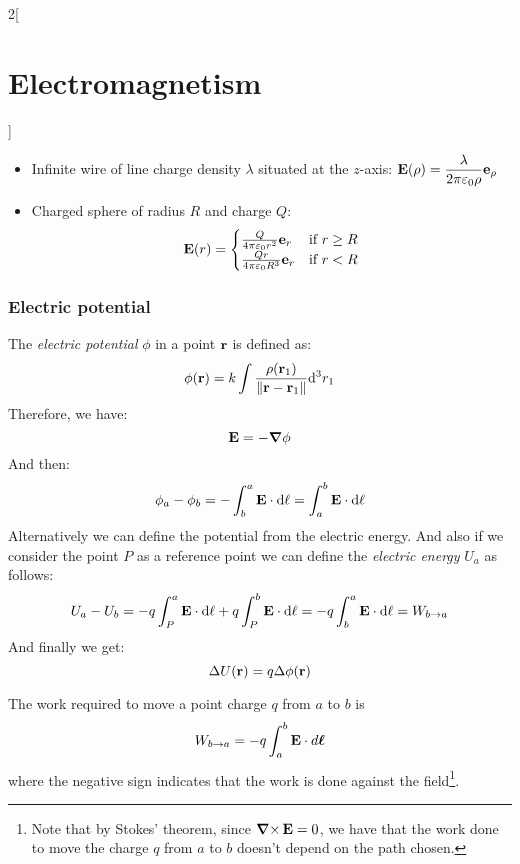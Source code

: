 \documentclass[../../../main_physics.tex]{subfiles}
\begin{document}
\begin{multicols}{2}[\section{Electromagnetism}]
\begin{proposition}
\begin{itemize}
      \item Infinite wire of line charge density $\lambda$ situated at the $z$-axis:  $\displaystyle \boldsymbol{\mathrm{E}}(\rho)=\frac{\lambda}{2\pi\varepsilon_0 \rho}\boldsymbol{\mathrm{e}}_\rho$
      \item Charged sphere of radius $R$ and charge $Q$:
            $$\boldsymbol{\mathrm{E}}(r)=
              \begin{cases}
                \frac{Q}{4\pi\varepsilon_0r^2}\boldsymbol{\mathrm{e}}_r  & \text{if }r\geq R \\
                \frac{Qr}{4\pi\varepsilon_0R^3}\boldsymbol{\mathrm{e}}_r & \text{if }r<R
              \end{cases}
            $$
    \end{itemize}
  \end{proposition}
  \subsubsection{Electric potential}
  \begin{definition}
    The \emph{electric potential} $\phi$ in a point $\boldsymbol{\mathrm{r}}$ is defined as:
    \begin{equation}
      \phi(\boldsymbol{\mathrm{r}})=k\int\frac{\rho(\boldsymbol{\mathrm{r}}_1)}{\|\boldsymbol{\mathrm{r}}-\boldsymbol{\mathrm{r}}_1\|}\dd^3 r_1
    \end{equation}
    Therefore, we have:
    \begin{equation}
      \boldsymbol{\mathrm{E}}=-\grad\phi
      \label{E_potential}
    \end{equation}
    And then: $$\phi_a-\phi_b=-\int_b^a\boldsymbol{\mathrm{E}}\cdot \dd{\ell}=\int_a^b\boldsymbol{\mathrm{E}}\cdot \dd{\ell}$$ Alternatively we can define the potential from the electric energy.  And also if we consider the point $P$ as a reference point we can define the \emph{electric energy} $U_a$ as follows: $$U_a-U_b=-q\int_P^a\boldsymbol{\mathrm{E}}\cdot \dd{\ell}+q\int_P^b\boldsymbol{\mathrm{E}}\cdot \dd{\ell}=-q\int_b^a\boldsymbol{\mathrm{E}}\cdot \dd{\ell}=W_{b\to a}$$ And finally we get: $$\Delta U(\boldsymbol{\mathrm{r}})=q\Delta\phi(\boldsymbol{\mathrm{r}})$$
  \end{definition}
  \begin{proposition}[Work]
    The work required to move a point charge $q$ from $a$ to $b$ is $$W_{b\to a}=-q\int_a^b\boldsymbol{\mathrm{E}}\cdot d\boldsymbol{\mathrm{\ell}}$$ where the negative sign indicates that the work is done against the field\footnote{Note that by Stokes' theorem, since $\operatorname{\boldsymbol{\mathrm{\nabla}}\times}\boldsymbol{\mathrm{E}}=0$, we have that the work done to move the charge $q$ from $a$ to $b$ doesn't depend on the path chosen.}.
  \end{proposition}
  \begin{definition}

\end{definition}
\end{multicols}
\end{document}
